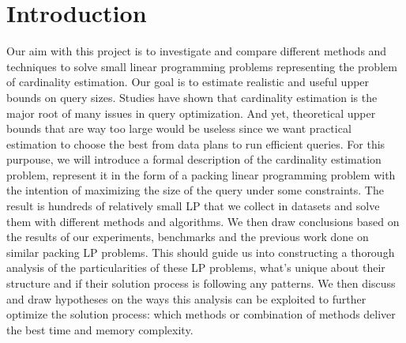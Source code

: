 
\chapter{Introduction}\label{chapter:introduction}

Our aim with this project is to investigate and compare different methods 
and techniques to solve small linear programming problems representing 
the problem of cardinality estimation. Our goal is to 
estimate realistic and useful upper bounds on query sizes. Studies have 
shown that cardinality estimation is the major root of many issues in 
query optimization\parencite{ngo2022information}. And yet, theoretical upper bounds that
are way too large would be useless since we want practical estimation to choose
the best from data plans to run efficient queries.
For this purpouse, we will introduce a formal description of the cardinality
estimation problem, represent it in the form of a packing linear programming problem with
the intention of maximizing the size of the query under some constraints. The result is
hundreds of relatively small LP that we collect in datasets and solve them 
with different methods and algorithms. We then draw conclusions based on the results of
our experiments, benchmarks and the previous work done on similar packing LP problems.
This should guide us into constructing a thorough analysis of the particularities of
these LP problems, what's unique about their structure and if their solution
process is following any patterns. We then discuss and draw hypotheses on the ways this 
analysis can be exploited to further optimize the solution process: which methods or 
combination of methods deliver the best time and memory complexity.
